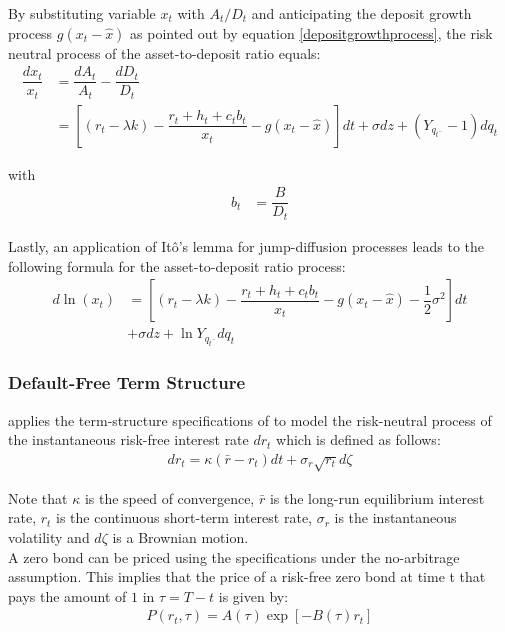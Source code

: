 By substituting variable $x_t$ with $A_t/D_t$ and anticipating the deposit growth process $g\left(x_t - \hat{x}\right)$ as pointed out by equation \ref{depositgrowthprocess}, the risk neutral process of the asset-to-deposit ratio equals:
\begin{align}
\dfrac{dx_t}{x_t}&= \dfrac{dA_t}{A_t} - \dfrac{dD_t}{D_t}\\ \nonumber
&= \left[ \left(r_t - \lambda k \right) - \dfrac{r_t + h_t + c_t b_t}{x_t} - g\left(x_t - \hat{x}\right)\right] dt + \sigma dz + \left( Y_{q_{t^{-}}} - 1 \right) dq_t
\end{align}

with
\begin{align}
b_t &= \dfrac{B}{D_t}
\end{align}

Lastly, an application of It\^{o}'s lemma for jump-diffusion processes leads to the following formula for the asset-to-deposit ratio process:
\begin{align}
d \ln\left(x_t\right) &= \left[ \left( r_t - \lambda k \right) - \dfrac{r_t + h_t + c_t b_t}{x_t} - g\left( x_t - \hat{x} \right) - \dfrac{1}{2} \sigma^2 \right] dt \\ \nonumber
&+ \sigma dz + \ln Y_{q_{t^{-}}} dq_t
\end{align}

\subsubsection*{Default-Free Term Structure}
\label{termstructure}

\citet{pennacchi2010structural} applies the term-structure specifications of \citet{cox1985theory} to model the risk-neutral process of the instantaneous risk-free interest rate $dr_t$ which is defined as follows:
\begin{align}
dr_t = \kappa \left(\bar{r} - r_t \right) dt + \sigma_r \sqrt{r_t} d \zeta
\end{align}

Note that $\kappa$ is the speed of convergence, $\bar{r}$ is the long-run equilibrium interest rate, $r_t$ is the continuous short-term interest rate, $\sigma_r$ is the instantaneous volatility and $d\zeta$ is a Brownian motion.\\

A zero bond can be priced using the \citet{cox1985theory} specifications under the no-arbitrage assumption. This implies that the price of a risk-free zero bond at time t that pays the amount of \EUR $1$ in $\tau = T - t$ is given by:
\begin{align} \label{zerobondprice}
P\left( r_t, \tau \right) = A\left(\tau \right) \exp\left[ - B\left( \tau \right) r_t \right]
\end{align}

